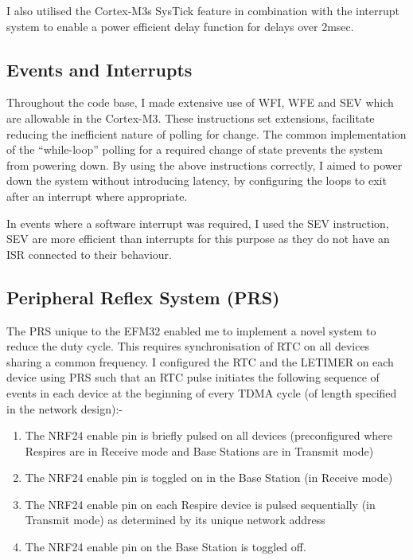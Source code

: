 I also utilised the Cortex-M3s SysTick feature in combination with the interrupt system to enable a
power efficient delay function for delays over 2msec.


\subsection{Events and Interrupts}
Throughout the code base, I made extensive use of \acf{WFI}, \acf{WFE} and \acf{SEV}
which are allowable in the Cortex-M3. These instructions set extensions,
facilitate reducing the inefficient nature of polling for change. The common implementation of the
``while-loop'' polling for a required change of state prevents the system from powering down. By
using the above instructions correctly, I aimed to power down the system without introducing
latency, by configuring the loops to exit after an interrupt where appropriate.


In events where a software interrupt was required, I used the \ac{SEV} instruction, \ac{SEV} are more
efficient than interrupts for this purpose as they do not have an \ac{ISR}
connected to their behaviour.


\subsection{Peripheral Reflex System (PRS)}
\label{sec:PRS}
The \ac{PRS} unique to the EFM32 enabled me to implement a novel system to reduce the duty cycle.
This requires synchronisation of \ac{RTC} on all devices sharing a common frequency. I
configured the \ac{RTC} and the \ac{LETIMER} on each device using \ac{PRS} such that an \ac{RTC}
pulse initiates the following sequence of events in each device at the beginning of every \ac{TDMA} cycle
(of length specified in the network design):-
\begin{enumerate}
  \item The NRF24 enable pin is briefly pulsed on all devices (preconfigured where Respires are in
        Receive mode and Base Stations are in Transmit mode)
  \item The NRF24 enable pin is toggled on in the Base Station (in Receive mode)
  \item The NRF24 enable pin on each Respire device is pulsed sequentially (in Transmit mode) as
        determined by its unique network address
  \item The NRF24 enable pin on the Base Station is toggled off.
\end{enumerate}


